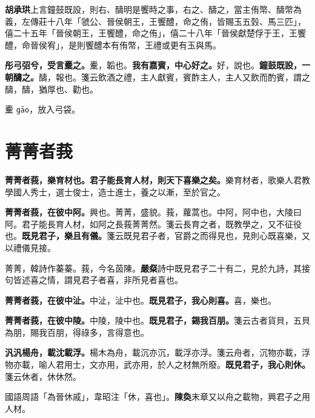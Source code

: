 \begin{quoting}\textbf{胡承珙}上言鐘鼓既設，則右、醻明是饗時之事，右之、醻之，當主侑幣、醻幣為義，左傳莊十八年「虢公、晉侯朝王，王饗醴，命之侑，皆賜玉五瑴、馬三匹」，僖二十五年「晉侯朝王，王饗醴，命之侑」，僖二十八年「晉侯獻楚俘于王，王饗醴，命晉侯宥」，是則饗醴本有侑幣，王禮或更有玉與馬。\end{quoting}

\textbf{彤弓弨兮，受言櫜之。}{\footnotesize 櫜，韜也。}\textbf{我有嘉賓，中心好之。}{\footnotesize 好，說也。}\textbf{鐘鼓既設，一朝醻之。}{\footnotesize 醻，報也。箋云飲酒之禮，主人獻賓，賓酢主人，主人又飲而酌賓，謂之醻，醻，猶厚也、勸也。}

\begin{quoting}櫜 \texttt{gāo}，放入弓袋。\end{quoting}

\section{菁菁者莪}


\textbf{菁菁者莪，樂育材也。君子能長育人材，則天下喜樂之矣。}{\footnotesize 樂育材者，歌樂人君教學國人秀士，選士俊士，造士進士，養之以漸，至於官之。}

\textbf{菁菁者莪，在彼中阿。}{\footnotesize 興也。菁菁，盛貌。莪，蘿蒿也。中阿，阿中也，大陵曰阿。君子能長育人材，如阿之長莪菁菁然。箋云長育之者，既教學之，又不征役也。}\textbf{既見君子，樂且有儀。}{\footnotesize 箋云既見君子者，官爵之而得見也，見則心既喜樂，又以禮儀見接。}

\begin{quoting}菁菁，韓詩作蓁蓁。莪，今名茵陳。\textbf{嚴粲}詩中既見君子二十有二，見於九詩，其接句皆述喜之情，謂見君子者喜，非所見者喜也。\end{quoting}

\textbf{菁菁者莪，在彼中沚。}{\footnotesize 中沚，沚中也。}\textbf{既見君子，我心則喜。}{\footnotesize 喜，樂也。}

\textbf{菁菁者莪，在彼中陵。}{\footnotesize 中陵，陵中也。}\textbf{既見君子，錫我百朋。}{\footnotesize 箋云古者貨貝，五貝為朋，賜我百朋，得祿多，言得意也。}

\textbf{汎汎楊舟，載沈載浮。}{\footnotesize 楊木為舟，載沉亦沉，載浮亦浮。箋云舟者，沉物亦載，浮物亦載，喻人君用士，文亦用，武亦用，於人之材無所廢。}\textbf{既見君子，我心則休。}{\footnotesize 箋云休者，休休然。}

\begin{quoting}國語周語「為晉休戚」，韋昭注「休，喜也」。\textbf{陳奐}末章又以舟之載物，興君子之用人材。\end{quoting}

